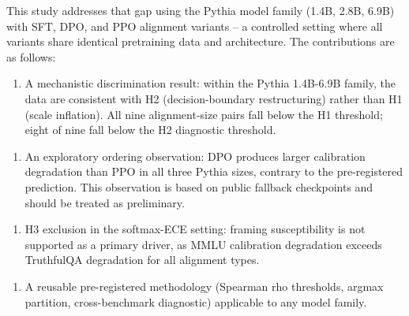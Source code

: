 This study addresses that gap using the Pythia model family (1.4B, 2.8B, 6.9B) with SFT, DPO, and PPO alignment variants -- a controlled setting where all variants share identical pretraining data and architecture. The contributions are as follows:

\begin{enumerate}
\item A mechanistic discrimination result: within the Pythia 1.4B-6.9B family, the data are consistent with H2 (decision-boundary restructuring) rather than H1 (scale inflation). All nine alignment-size pairs fall below the H1 threshold; eight of nine fall below the H2 diagnostic threshold.
\end{enumerate}

\begin{enumerate}
\item An exploratory ordering observation: DPO produces larger calibration degradation than PPO in all three Pythia sizes, contrary to the pre-registered prediction. This observation is based on public fallback checkpoints and should be treated as preliminary.
\end{enumerate}

\begin{enumerate}
\item H3 exclusion in the softmax-ECE setting: framing susceptibility is not supported as a primary driver, as MMLU calibration degradation exceeds TruthfulQA degradation for all alignment types.
\end{enumerate}

\begin{enumerate}
\item A reusable pre-registered methodology (Spearman rho thresholds, argmax partition, cross-benchmark diagnostic) applicable to any model family.
\end{enumerate}
